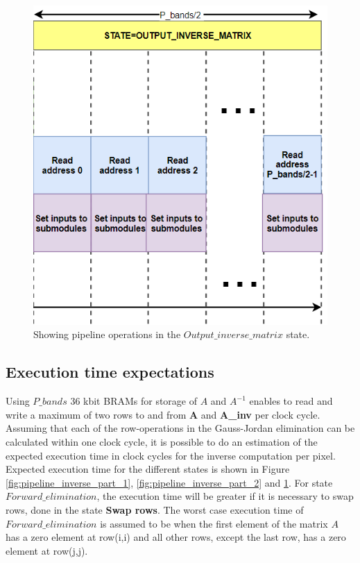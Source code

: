 \begin{figure}[H]
\centering

   \includegraphics[scale=0.4]{images/estimation_execution_time/pipeline_inverse_matrix_part_3.PNG}
  \caption{Showing pipeline operations in the $Output\_inverse\_matrix$ state.  } 
  \label{fig:pipeline_inverse_part_3}
\end{figure}



\subsection{Execution time expectations}
Using $P\_bands$ 36 kbit BRAMs for storage of $A$ and $A^{-1}$ enables to read and write a maximum of two rows to and from \textbf{A} and \textbf{A\_inv} per clock cycle. Assuming that each of the row-operations in the Gauss-Jordan elimination can be calculated within one clock cycle, it is possible to do an estimation of the expected execution time in clock cycles for the inverse computation per pixel. \\

Expected execution time for the different states is shown in Figure \ref{fig:pipeline_inverse_part_1}, \ref{fig:pipeline_inverse_part_2} and \ref{fig:pipeline_inverse_part_3}. For state $Forward\_elimination$, the execution time will be greater if it is necessary to swap rows, done in the state \textbf{Swap rows}. The worst case execution time of $Forward\_elimination$ is assumed to be when the first element of the matrix $A$ has a zero element at row(i,i) and all other rows, except the last row, has a zero element at row(j,j). \\

